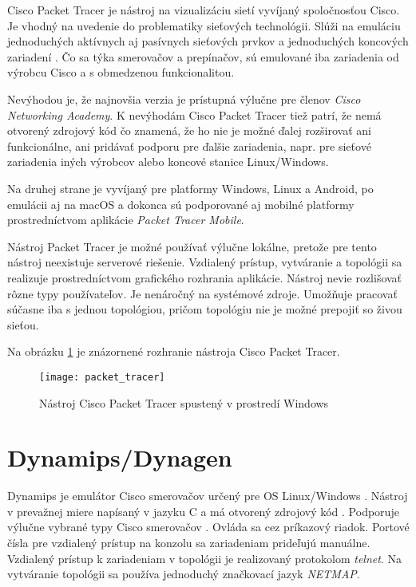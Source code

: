 Cisco Packet Tracer je nástroj na vizualizáciu sietí vyvíjaný spoločnosťou Cisco. Je vhodný na uvedenie do problematiky sieťových technológii. Slúži na emuláciu jednoduchých aktívnych aj pasívnych sieťových prvkov a jednoduchých koncových zariadení \cite{packet_tracer}. Čo sa týka smerovačov a prepínačov, sú emulované iba zariadenia od výrobcu Cisco a s obmedzenou funkcionalitou.

Nevýhodou je, že najnovšia verzia je prístupná výlučne pre členov \emph{Cisco Networking Academy}. K nevýhodám Cisco Packet Tracer tiež patrí, že nemá otvorený zdrojový kód čo znamená, že ho nie je možné ďalej rozširovať ani funkcionálne, ani pridávať podporu pre ďalšie zariadenia, napr. pre sieťové zariadenia iných výrobcov alebo koncové stanice Linux/Windows. 

Na druhej strane je vyvíjaný pre platformy Windows, Linux a Android, po emulácii aj na macOS \cite{packet_tracer_mac} a dokonca sú podporované aj mobilné platformy prostredníctvom aplikácie \emph{Packet Tracer Mobile}.

Nástroj Packet Tracer je možné používať výlučne lokálne, pretože pre tento nástroj neexistuje serverové riešenie. Vzdialený prístup, vytváranie a  topológii sa realizuje prostredníctvom grafického rozhrania aplikácie. Nástroj nevie rozlišovať rôzne typy používateľov. Je nenáročný na systémové zdroje. Umožňuje pracovať súčasne iba s jednou topológiou, pričom topológiu nie je možné prepojiť so živou sieťou.

Na obrázku \ref{obr:packet_tracer} je znázornené rozhranie nástroja Cisco Packet Tracer.

\begin{figure}
    \centering
    \texttt{[image: packet\_tracer]}
    \caption{Nástroj Cisco Packet Tracer spustený v prostredí Windows}
    \cite{obr_packet_tracer}
    \label{obr:packet_tracer}
\end{figure}





\section{Dynamips/Dynagen}

Dynamips je emulátor Cisco smerovačov určený pre OS  Linux/Windows \cite{dynamips}. Nástroj v prevažnej miere napísaný v jazyku C a má otvorený zdrojový kód \cite{dynamips_github}. Podporuje výlučne vybrané typy Cisco smerovačov \cite{dynamips}. Ovláda sa cez príkazový riadok. Portové čísla pre vzdialený prístup na konzolu sa zariadeniam prideľujú manuálne. Vzdialený prístup k zariadeniam v topológii je realizovaný protokolom \emph{telnet}. Na vytváranie topológii sa používa jednoduchý značkovací jazyk \emph{NETMAP}.

